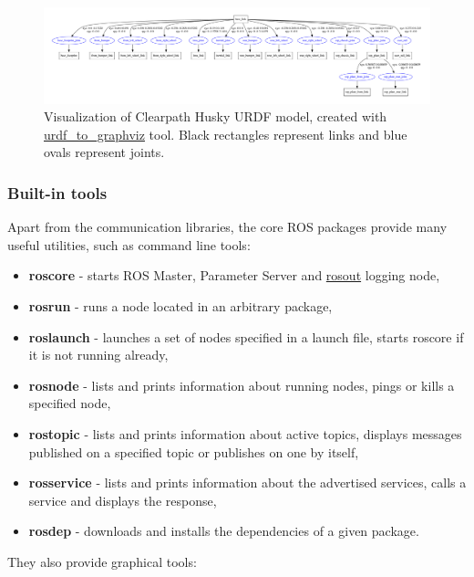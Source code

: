 \documentclass[english,inz,shortabstract]{iithesis}
\begin{document}
    \begin{figure}[ht]
        \centering
        \captionsetup{margin=1cm}
        \includegraphics[width=\textwidth]{img/husky.pdf}
        \caption{Visualization of Clearpath Husky URDF model, created with \href{http://wiki.ros.org/urdf\#Visualization}{urdf\_to\_graphviz} tool. Black rectangles represent links and blue ovals represent joints.}
        \label{fig:husky}
    \end{figure}

\pagebreak

        \subsubsection{Built-in tools}
        Apart from the communication libraries, the core ROS packages provide many useful utilities, such as command line tools:

        \begin{itemize}[itemsep=0pt, parsep=2pt, topsep=0pt]
            \item \textbf{roscore} - starts ROS Master, Parameter Server and \href{http://wiki.ros.org/rosout#rosout-1}{rosout} logging node,
            \item \textbf{rosrun} - runs a node located in an arbitrary package,
            \item \textbf{roslaunch} - launches a set of nodes specified in a launch file, starts roscore if it is not running already,
            \item \textbf{rosnode} - lists and prints information about running nodes, pings or kills a specified node,
            \item \textbf{rostopic} - lists and prints information about active topics, displays messages published on a specified topic or publishes on one by itself,
            \item \textbf{rosservice} - lists and prints information about the advertised services, calls a service and displays the response,
            \item \textbf{rosdep} - downloads and installs the dependencies of a given package.
        \end{itemize}
        They also provide graphical tools:
\end{document}
